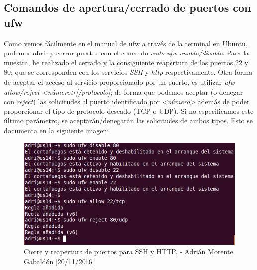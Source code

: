 	\subsection{Comandos de apertura/cerrado de puertos con ufw}
	Como vemos fácilmente en el manual de ufw a través de la terminal en Ubuntu, podemos abrir y cerrar puertos con el comando \emph{sudo ufw enable/disable}. Para la muestra, he realizado el cerrado y la consiguiente reapertura de los puertos 22 y 80; que se corresponden con los servicios \emph{SSH} y \emph{http} respectivamente.
	Otra forma de aceptar el acceso al servicio proporcionado por un puerto, es utilizar \emph{ufw allow/reject <número>[/protocolo]}; de forma que podemos aceptar (o denegar con \emph{reject}) las solicitudes al puerto identificado por \emph{<número>} además de poder proporcionar el tipo de protocolo deseado (TCP o UDP). Si no especificamos este último parámetro, se aceptarán/denegarán las solicitudes de ambos tipos. Esto se documenta en la siguiente imagen:
	\begin{figure}[H]
		\centering
		\includegraphics[scale=0.75]{ufw-enable}
		\caption{Cierre y reapertura de puertos para SSH y HTTP. - Adrián Morente Gabaldón [20/11/2016]}
		\label{fig:figura1}
	\end{figure}

